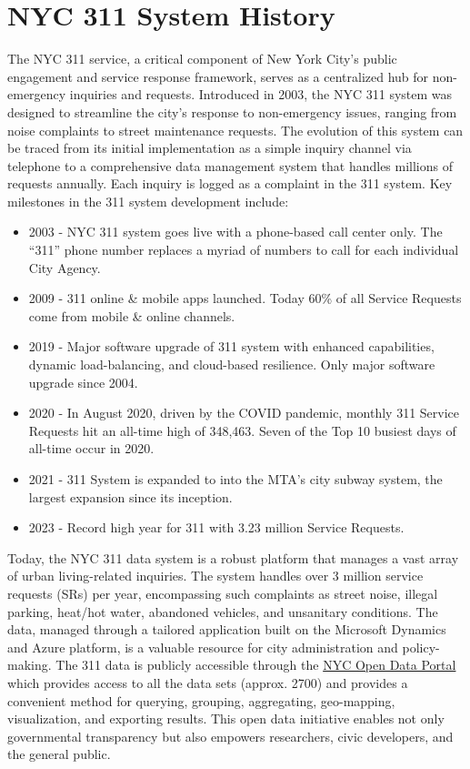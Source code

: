 \documentclass[12pt, titlepage]{article}
\begin{document}
\section{NYC 311 System History} \label{sec:history}

The NYC 311 service, a critical component of New York City's public
engagement and service response framework, serves as a centralized hub
for non-emergency inquiries and requests. Introduced in 2003, the NYC
311 system was designed to streamline the city's response to
non-emergency issues, ranging from noise complaints to street
maintenance requests. The evolution of this system can be traced from
its initial implementation as a simple inquiry channel via telephone to a
comprehensive data management system that handles millions of requests
annually. Each inquiry is logged as a complaint in the 311 system.
Key milestones in the 311 system development include:

\begin{itemize}
 	\item 2003 - NYC 311 system goes live with a phone-based call center only. The ``311'' phone number replaces a myriad of numbers to call for each individual City Agency.
   	\item 2009 - 311 online \& mobile apps launched. Today 60\% of all Service Requests come from mobile \& online channels.
   	\item 2019 - Major software upgrade of 311 system with enhanced capabilities, dynamic load-balancing, and cloud-based resilience. Only major software upgrade since 2004.	
      \item 2020 - In August 2020, driven by the COVID pandemic, monthly 311 Service Requests hit an all-time high of 348,463. Seven of the Top 10 busiest days of all-time occur in 2020.
      \item 2021 - 311 System is expanded to into the MTA's city subway system, the largest expansion since its inception.
   	\item 2023 - Record high year for 311 with 3.23 million Service Requests.
\end{itemize}

Today, the NYC 311 data system is a robust platform that manages a
vast array of urban living-related inquiries. The system handles over 3 million service 
requests (SRs) per year, encompassing such complaints as street noise, illegal parking, heat/hot water, abandoned vehicles,
and unsanitary conditions. The data, managed through a tailored application built on the 
Microsoft Dynamics and Azure platform, is a valuable resource for city
administration and policy-making. The 311 data is publicly accessible through the 
\href{https://opendata.cityofnewyork.us/}{NYC Open Data Portal} which provides access
to all the data sets (approx. 2700) and provides a convenient method for querying, grouping, aggregating, geo-mapping, visualization, and exporting
results. This open data initiative enables not only governmental transparency but also empowers 
researchers, civic developers, and the general public. 
\end{document}
